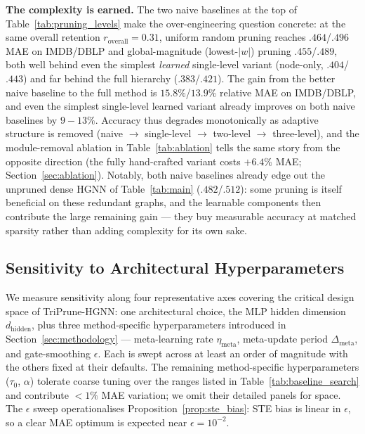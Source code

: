 \documentclass[10pt]{article}
\theoremstyle{plain}
\theoremstyle{definition}
\begin{document}
\textbf{The complexity is earned.} The two naive baselines at the top of Table~\ref{tab:pruning_levels} make the over-engineering question concrete: at the same overall retention $r_{\mathrm{overall}}\!=\!0.31$, uniform random pruning reaches $.464$/$.496$ MAE on IMDB/DBLP and global-magnitude (lowest-$|w|$) pruning $.455$/$.489$, both well behind even the simplest \emph{learned} single-level variant (node-only, $.404$/$.443$) and far behind the full hierarchy ($.383$/$.421$). The gain from the better naive baseline to the full method is $15.8\%$/$13.9\%$ relative MAE on IMDB/DBLP, and even the simplest single-level learned variant already improves on both naive baselines by $9\!-\!13\%$. Accuracy thus degrades monotonically as adaptive structure is removed (naive $\rightarrow$ single-level $\rightarrow$ two-level $\rightarrow$ three-level), and the module-removal ablation in Table~\ref{tab:ablation} tells the same story from the opposite direction (the fully hand-crafted variant costs $+6.4\%$ MAE; Section~\ref{sec:ablation}). Notably, both naive baselines already edge out the unpruned dense HGNN of Table~\ref{tab:main} ($.482$/$.512$): some pruning is itself beneficial on these redundant graphs, and the learnable components then contribute the large remaining gain --- they buy measurable accuracy at matched sparsity rather than adding complexity for its own sake.

\subsection{Sensitivity to Architectural Hyperparameters}
\label{sec:sensitivity_comprehensive}

We measure sensitivity along four representative axes covering the critical design space of TriPrune-HGNN: one architectural choice, the MLP hidden dimension $d_{\mathrm{hidden}}$, plus three method-specific hyperparameters introduced in Section~\ref{sec:methodology} --- meta-learning rate $\eta_{\mathrm{meta}}$, meta-update period $\Delta_{\mathrm{meta}}$, and gate-smoothing $\epsilon$. Each is swept across at least an order of magnitude with the others fixed at their defaults. The remaining method-specific hyperparameters ($\tau_0$, $\alpha$) tolerate coarse tuning over the ranges listed in Table~\ref{tab:baseline_search} and contribute $<\!1\%$ MAE variation; we omit their detailed panels for space. The $\epsilon$ sweep operationalises Proposition~\ref{prop:ste_bias}: STE bias is linear in $\epsilon$, so a clear MAE optimum is expected near $\epsilon\!=\!10^{-2}$.
\end{document}
